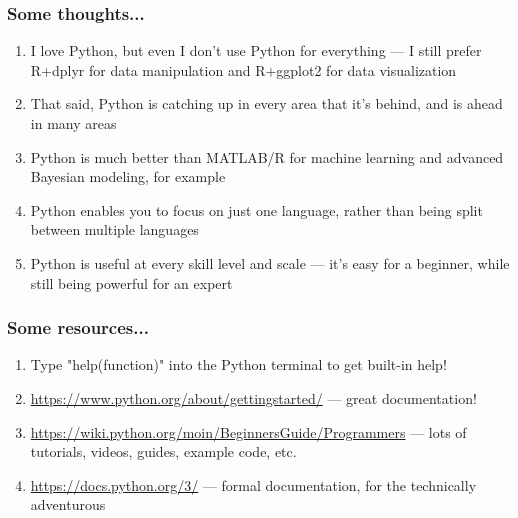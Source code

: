 \documentclass{beamer}\usepackage[]{graphicx}\usepackage[]{color}
\begin{document}
\begin{frame}
\frametitle{Some thoughts...}
	\begin{enumerate}
		\item I love Python, but even I don't use Python for everything --- I still prefer R+dplyr for data manipulation and R+ggplot2 for data visualization

		\item That said, Python is catching up in every area that it's behind, and is ahead in many areas

		\item Python is much better than MATLAB/R for machine learning and advanced Bayesian modeling, for example 

		\item Python enables you to focus on just one language, rather than being split between multiple languages

		\item Python is useful at every skill level and scale --- it's easy for a beginner, while still being powerful for an expert 
	\end{enumerate}
\end{frame}

\begin{frame}
\frametitle{Some resources...}
	\begin{enumerate}
		\item Type "help(function)" into the Python terminal to get built-in help!

		\item \url{https://www.python.org/about/gettingstarted/} --- great documentation!

		\item \url{https://wiki.python.org/moin/BeginnersGuide/Programmers} --- lots of tutorials, videos, guides, example code, etc.

		\item \url{https://docs.python.org/3/} --- formal documentation, for the technically adventurous
	\end{enumerate}
\end{frame}
\end{document}
